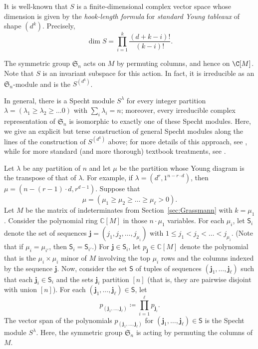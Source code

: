 It is well-known that $S$ is a finite-dimensional complex vector space whose dimension is given by the \emph{hook-length formula} for \emph{standard Young tableaux} of shape $(d^k)$. Precisely, 
\[
\dim S = \prod_{i=1}^{k} \frac{(d+k-i)!}{(k-i)!}.
\]

The symmetric group $\mathfrak{S}_n$ acts on $M$ by permuting columns, and hence on $\C[M]$. Note that $S$ is an invariant subspace for this action. In fact, it is irreducible as an $\mathfrak{S}_n$-module and is the  $S^{(d^k)}$.

In general, there is a Specht module $S^\lambda$ for every integer partition $\lambda = (\lambda_1 \geq \lambda_2 \geq \dots 0)$ with $\sum_i \lambda_i = n$; moreover, every irreducible complex representation of $\mathfrak{S}_n$ is isomorphic to exactly one of these Specht modules. Here, we give an explicit but terse construction of general Specht modules along the lines of the construction of $S^{(d^k)}$ above; for more details of this approach, see \cite[\S2.3]{Patrias.Pechenik.Striker}, while for more standard (and more thorough) textbook treatments, see \eg \cite{Fulton.Harris,Fulton:YoungTableaux,Sagan}. 

Let $\lambda$ be any partition of $n$ and let $\mu$ be the partition whose Young diagram is the transpose of that of $\lambda$. For example, if $\lambda = (d^r,1^{n - r \cdot d})$, then $\mu  = (n - (r-1) \cdot d, r^{d-1})$. Suppose that 
\[
\mu = (\mu_1 \geq \mu_2 \geq \dots \geq \mu_\ell > 0).
\]
Let $M$ be the matrix of indeterminates from Section~\ref{sec:Grassmann} with $k = \mu_1$. Consider the polynomial ring $\mathbb{C}[M]$ in those $n \cdot \mu_1$ variables. For each $\mu_i$, let $\mathsf{S}_i$ denote the set of sequences $\mathbf{j} = (j_1, j_2, \dots, j_{\mu_i})$ with $1 \leq j_1 < j_2 < \dots < j_{\mu_i}$. (Note that if $\mu_i = \mu_{i'}$, then $\mathsf{S}_i = \mathsf{S}_{i'}$.) For $\mathbf{j} \in \mathsf{S}_i$, let $p_{\mathbf{j}} \in \mathbb{C}[M]$ denote the polynomial that is the $\mu_i \times \mu_i$ minor of $M$ involving the top $\mu_i$ rows and the columns indexed by the sequence $\mathbf{j}$. Now, consider the set $\mathsf{S}$ of tuples of sequences $(\mathbf{j}_1, \dots, \mathbf{j}_\ell)$ such that each $\mathbf{j}_i \in \mathsf{S}_i$ and the sets $\mathbf{j}_i$ partition $[n]$ (that is, they are pairwise disjoint with union $[n]$).
For each $(\mathbf{j}_1, \dots, \mathbf{j}_\ell) \in \mathsf{S}$, let \[
p_{(\mathbf{j}_1, \dots, \mathbf{j}_\ell)} \coloneqq \prod_{i=1}^\ell p_{\mathbf{j}_i}.
\]
The vector span of the polynomials $p_{(\mathbf{j}_1, \dots, \mathbf{j}_\ell)}$ for $(\mathbf{j}_1, \dots, \mathbf{j}_\ell) \in \mathsf{S}$ is the Specht module $S^\lambda$. Here, the symmetric group $\mathfrak{S}_n$ is acting by permuting the columns of $M$.

